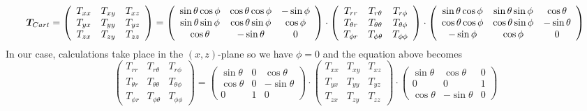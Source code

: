 \[
{\bm T}_{\tiny Cart}=
\left(
\begin{array}{ccc}
T_{xx} & T_{xy} & T_{xz} \\
T_{yx} & T_{yy} & T_{yz} \\
T_{zx} & T_{zy} & T_{zz} 
\end{array}
\right)
=
\left(
\begin{array}{ccc}
\sin\theta\cos\phi & \cos\theta\cos\phi & -\sin\phi \\
\sin\theta\sin\phi & \cos\theta\sin\phi & \cos\phi \\
\cos\theta & -\sin\theta & 0
\end{array}
\right)
\cdot
\left(
\begin{array}{ccc}
T_{rr}       & T_{r\theta}      & T_{r\phi} \\
T_{\theta r} & T_{\theta\theta} & T_{\theta\phi} \\
T_{\phi r}   & T_{\phi \theta}  & T_{\phi\phi}
\end{array}
\right)
\cdot
\left(
\begin{array}{ccc}
\sin\theta \cos\phi & \sin\theta \sin\phi & \cos\theta \\
\cos\theta \cos\phi & \cos\theta \sin\phi & -\sin\theta \\
-\sin\phi & \cos\phi & 0 
\end{array}
\right)
\]
In our case, calculations take place in the 
$(x,z)$-plane so we have $\phi=0$ and the equation above 
becomes
\[
\left(
\begin{array}{ccc}
T_{rr}       & T_{r\theta}      & T_{r\phi} \\
T_{\theta r} & T_{\theta\theta} & T_{\theta\phi} \\
T_{\phi r}   & T_{\phi \theta}  & T_{\phi\phi}
\end{array}
\right)
=
\left(
\begin{array}{ccc}
\sin\theta  & 0 & \cos\theta \\
\cos\theta  & 0 & -\sin\theta \\
0 & 1 & 0 
\end{array}
\right)
\cdot
\left(
\begin{array}{ccc}
T_{xx} & T_{xy} & T_{xz} \\
T_{yx} & T_{yy} & T_{yz} \\
T_{zx} & T_{zy} & T_{zz} 
\end{array}
\right)
\cdot
\left(
\begin{array}{ccc}
\sin\theta & \cos\theta & 0 \\
0 & 0 & 1 \\
\cos\theta & -\sin\theta & 0
\end{array}
\right)
\]
